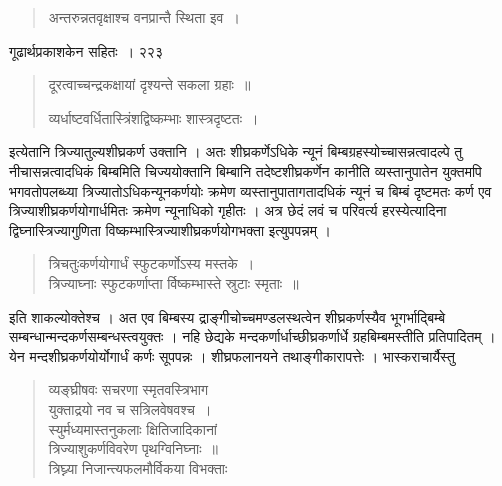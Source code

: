 \documentclass[11pt, openany]{book}
\begin{document}

\begin{quote}
{\qt अन्तरुन्नतवृक्षाश्च वनप्रान्तै स्थिता इव~।\\}
\end{quote}
\newpage

\hspace{3cm} गूढार्थप्रकाशकेन सहितः~। \hfill २२३

\begin{quote}
{\qt दूरत्वाच्चन्द्रकक्षायां दृश्यन्ते सकला ग्रहाः~॥
 
व्यर्धाष्टवर्धितास्त्रिंशद्विष्कम्भाः शास्त्रदृष्टतः~।\\}
\end{quote}


इत्येतानि त्रिज्यातुल्यशीघ्रकर्ण उक्तानि । अतः शीघ्रकर्णेऽधिके न्यूनं बिम्बग्रहस्योच्चासन्नत्वादल्पे तु नीचासन्नत्वादधिकं बिम्बमिति चिज्ययोक्तानि बिम्बानि तदेष्टशीघ्रकर्णेन कानीति व्यस्तानुपातेन युक्तमपि भगवतोपलब्ध्या त्रिज्यातोऽधिकन्यूनकर्णयोः क्रमेण व्यस्तानुपातागतादधिकं न्यूनं च बिम्बं दृष्टमतः कर्ण एव त्रिज्याशीघ्रकर्णयोगार्धमितः क्रमेण न्यूनाधिको गृहीतः । अत्र छेदं लवं च परिवर्त्य हरस्येत्यादिना द्विघ्नास्त्रिज्यागुणिता विष्कम्भास्त्रिज्याशीघ्रकर्णयोगभक्ता इत्युपपन्नम् ।


\begin{quote}
{\qt त्रिचतुःकर्णयोगार्धं स्फुटकर्णोऽस्य मस्तके~।\\
त्रिज्याघ्नाः स्फुटकर्णाप्ता र्विष्कम्भास्ते स्रुटाः स्मृताः~॥}
\end{quote}


इति शाकल्योक्तेश्च । अत एव बिम्बस्य द्राङ्गीचोच्चमण्डलस्थत्वेन शीघ्रकर्णस्यैव भूगर्भाद्बिम्बे सम्बन्धान्मन्दकर्णसम्बन्धस्त्वयुक्तः । नहि छेद्यके मन्दकर्णार्धाच्छीघ्रकर्णार्धे ग्रहबिम्बमस्तीति प्रतिपादितम् । येन मन्दशीघ्रकर्णयोर्योगार्धं कर्णः सूपपन्नः । शीघ्रफलानयने तथाङ्गीकारापत्तेः । भास्कराचार्यैस्तु\textendash


\begin{quote}
{\qt व्यङ्घ्रीषवः सचरणा स्मृतवस्त्रिभाग \\
युक्ताद्रयो नव च सत्रिलवेषवश्च~।\\
स्युर्मध्यमास्तनुकलाः क्षितिजादिकानां \\
त्रिज्याशुकर्णविवरेण पृथग्विनिघ्नाः~॥ \\

त्रिघ्न्या निजान्त्यफलमौर्विकया विभक्ताः}
\end{quote}
\newpage
\end{document}
